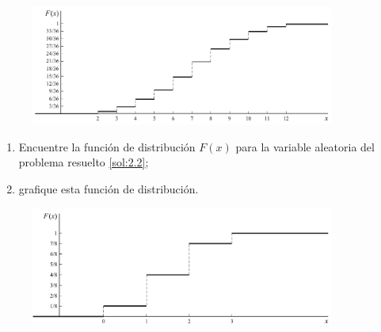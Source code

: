 \begin{figure}
	\centering
	\includegraphics[width=10cm,keepaspectratio=true]{./pe/pands0206.png}
\end{figure}




\begin{ejemplo}
	\label{sol:2.4}
	\begin{enumerate}
		\item Encuentre la función de distribución $F(x)$ para la variable aleatoria del problema resuelto \ref{sol:2.2};
		\item grafique esta función de distribución.
	\end{enumerate}
	
\end{ejemplo}



\begin{figure}
	\centering
	\includegraphics[width=10cm,keepaspectratio=true]{./pe/pands0207.png}
\end{figure}

